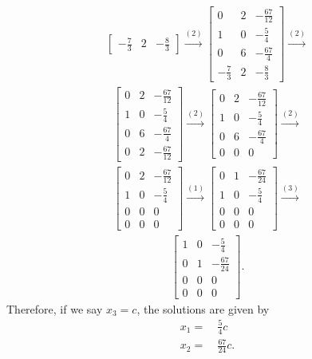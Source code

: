 \documentclass[12pt]{article}
\begin{document}
\begin{enumerate}
\begin{align*}
\begin{bmatrix}
        -\frac{7}{3} & 2 & -\frac{8}{3}
      \end{bmatrix}
      \xrightarrow{(2)}
      \begin{bmatrix}
        0            & 2 & -\frac{67}{12}\\
        1            & 0 & -\frac{5}{4}  \\
        0            & 6 & -\frac{67}{4} \\
        -\frac{7}{3} & 2 & -\frac{8}{3}
      \end{bmatrix}
      \xrightarrow{(2)}
    \end{align*}
    \begin{align*}
      \begin{bmatrix}
        0 & 2 & -\frac{67}{12}\\
        1 & 0 & -\frac{5}{4}  \\
        0 & 6 & -\frac{67}{4} \\
        0 & 2 & -\frac{67}{12}
      \end{bmatrix}
      \xrightarrow{(2)}
      \begin{bmatrix}
        0 & 2 & -\frac{67}{12}\\
        1 & 0 & -\frac{5}{4}  \\
        0 & 6 & -\frac{67}{4} \\
        0 & 0 & 0
      \end{bmatrix}
      \xrightarrow{(2)}
    \end{align*}
    \begin{align*}
      \begin{bmatrix}
        0 & 2 & -\frac{67}{12}\\
        1 & 0 & -\frac{5}{4}  \\
        0 & 0 & 0             \\
        0 & 0 & 0
      \end{bmatrix}
      \xrightarrow{(1)}
      \begin{bmatrix}
        0 & 1 & -\frac{67}{24}\\
        1 & 0 & -\frac{5}{4}  \\
        0 & 0 & 0             \\
        0 & 0 & 0
      \end{bmatrix}
      \xrightarrow{(3)}
    \end{align*}
    \begin{align*}
      \begin{bmatrix}
        1 & 0 & -\frac{5}{4}  \\
        0 & 1 & -\frac{67}{24}\\
        0 & 0 & 0             \\
        0 & 0 & 0
      \end{bmatrix}.
    \end{align*}
    Therefore, if we say $x_3 = c$, the solutions are given by
    \begin{align*}
      x_1 =&\ \frac{5}{4}c\\
      x_2 =&\ \frac{67}{24}c.
    \end{align*}


\end{enumerate}
\end{document}
